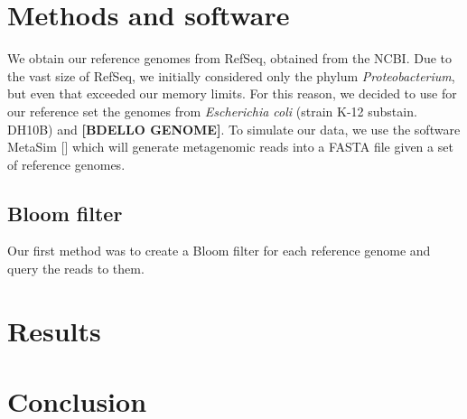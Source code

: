 \documentclass[12pt]{article} %
\begin{document}
\section{Methods and software}
We obtain our reference genomes from RefSeq, obtained from the NCBI. Due to the vast size of RefSeq, we initially considered only the phylum \emph{Proteobacterium}, but even that exceeded our memory limits. For this reason, we decided to use for our reference set the genomes from \emph{Escherichia coli} (strain K-12 substain. DH10B) and  {\bf[BDELLO GENOME]}. To simulate our data, we use the software MetaSim [\cite{Richter:2008dg}] which will generate metagenomic reads into a FASTA file given a set of reference genomes.
\par
\subsection{Bloom filter}
Our first method was to create a Bloom filter for each reference genome and query the reads to them. 
\section{Results}

\section{Conclusion}



\end{document}
